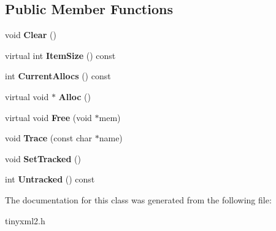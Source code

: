 \subsection*{Public Member Functions}
\begin{DoxyCompactItemize}
\item 
\hypertarget{classtinyxml2_1_1_mem_pool_t_a22d595caa0e9d23aa080f49ca6475fdd}{}void {\bfseries Clear} ()\label{classtinyxml2_1_1_mem_pool_t_a22d595caa0e9d23aa080f49ca6475fdd}

\item 
\hypertarget{classtinyxml2_1_1_mem_pool_t_ada2c610b3dd0fd1ab6df79d8fafd76b6}{}virtual int {\bfseries Item\+Size} () const \label{classtinyxml2_1_1_mem_pool_t_ada2c610b3dd0fd1ab6df79d8fafd76b6}

\item 
\hypertarget{classtinyxml2_1_1_mem_pool_t_a0573a38b5ca8c0578237bb27ff1a2149}{}int {\bfseries Current\+Allocs} () const \label{classtinyxml2_1_1_mem_pool_t_a0573a38b5ca8c0578237bb27ff1a2149}

\item 
\hypertarget{classtinyxml2_1_1_mem_pool_t_a810fd2b0caf56b8b688e55f2768f96c7}{}virtual void $\ast$ {\bfseries Alloc} ()\label{classtinyxml2_1_1_mem_pool_t_a810fd2b0caf56b8b688e55f2768f96c7}

\item 
\hypertarget{classtinyxml2_1_1_mem_pool_t_a408ce0918e9d3d5e5e1cc4896944875f}{}virtual void {\bfseries Free} (void $\ast$mem)\label{classtinyxml2_1_1_mem_pool_t_a408ce0918e9d3d5e5e1cc4896944875f}

\item 
\hypertarget{classtinyxml2_1_1_mem_pool_t_a47eefbd934ef70d973ea41d41ab5f239}{}void {\bfseries Trace} (const char $\ast$name)\label{classtinyxml2_1_1_mem_pool_t_a47eefbd934ef70d973ea41d41ab5f239}

\item 
\hypertarget{classtinyxml2_1_1_mem_pool_t_aee3c611215ae08cce41a940bf2763027}{}void {\bfseries Set\+Tracked} ()\label{classtinyxml2_1_1_mem_pool_t_aee3c611215ae08cce41a940bf2763027}

\item 
\hypertarget{classtinyxml2_1_1_mem_pool_t_afabb6844c7ef3b064a582568d3147c08}{}int {\bfseries Untracked} () const \label{classtinyxml2_1_1_mem_pool_t_afabb6844c7ef3b064a582568d3147c08}

\end{DoxyCompactItemize}


The documentation for this class was generated from the following file\+:\begin{DoxyCompactItemize}
\item 
tinyxml2.\+h\end{DoxyCompactItemize}
